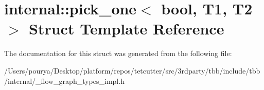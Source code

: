 \hypertarget{structinternal_1_1pick__one}{}\section{internal\+:\+:pick\+\_\+one$<$ bool, T1, T2 $>$ Struct Template Reference}
\label{structinternal_1_1pick__one}


The documentation for this struct was generated from the following file\+:\begin{DoxyCompactItemize}
\item 
/\+Users/pourya/\+Desktop/platform/repos/tetcutter/src/3rdparty/tbb/include/tbb/internal/\+\_\+flow\+\_\+graph\+\_\+types\+\_\+impl.\+h\end{DoxyCompactItemize}
